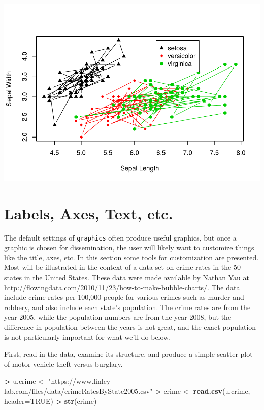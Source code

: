 \documentclass[
]{krantz}
\makeatletter
\newenvironment{Shaded}{\begin{snugshade}}{\end{snugshade}}
\newcommand{\DataTypeTok}[1]{\textcolor[rgb]{0.27,0.27,0.27}{#1}}
\newcommand{\KeywordTok}[1]{\textcolor[rgb]{0.27,0.27,0.27}{\textbf{#1}}}
\newcommand{\NormalTok}[1]{#1}
\newcommand{\OperatorTok}[1]{\textcolor[rgb]{0.43,0.43,0.43}{\textbf{#1}}}
\newcommand{\OtherTok}[1]{\textcolor[rgb]{0.37,0.37,0.37}{#1}}
\newcommand{\StringTok}[1]{\textcolor[rgb]{0.5,0.5,0.5}{#1}}
\newenvironment{kframe}{%
\medskip{}
\setlength{\fboxsep}{.8em}
 \def\at@end@of@kframe{}%
 \ifinner\ifhmode%
  \def\at@end@of@kframe{\end{minipage}}%
  \begin{minipage}{\columnwidth}%
 \fi\fi%
 \def\FrameCommand##1{\hskip\@totalleftmargin \hskip-\fboxsep
 \colorbox{shadecolor}{##1}\hskip-\fboxsep
     \hskip-\linewidth \hskip-\@totalleftmargin \hskip\columnwidth}%
 \MakeFramed {\advance\hsize-\width
   \@totalleftmargin\z@ \linewidth\hsize
   \@setminipage}}%
 {\par\unskip\endMakeFramed%
 \at@end@of@kframe}
\renewenvironment{Shaded}{\begin{kframe}}{\end{kframe}}
\makeatother
\begin{document}
\includegraphics{bookdown_files/figure-latex/unnamed-chunk-342-1.pdf}

\hypertarget{labels-axes-text-etc.-1}{%
\section{Labels, Axes, Text, etc.}\label{labels-axes-text-etc.-1}}

The default settings of \texttt{graphics} often produce useful graphics, but once a graphic is chosen for dissemination, the user will likely want to customize things like the title, axes, etc. In this section some tools for customization are presented. Most will be illustrated in the context of a data set on crime rates in the 50 states in the United States. These data were made available by Nathan Yau at \url{http://flowingdata.com/2010/11/23/how-to-make-bubble-charts/}. The data include crime rates per 100,000 people for various crimes such as murder and robbery, and also include each state's population. The crime rates are from the year 2005, while the population numbers are from the year 2008, but the difference in population between the years is not great, and the exact population is not particularly important for what we'll do below.

First, read in the data, examine its structure, and produce a simple scatter plot of motor vehicle theft versus burglary.

\begin{Shaded}
\begin{Highlighting}[]
\OperatorTok{\textgreater{}}\StringTok{ }\NormalTok{u.crime \textless{}{-}}\StringTok{ "https://www.finley{-}lab.com/files/data/crimeRatesByState2005.csv"}
\OperatorTok{\textgreater{}}\StringTok{ }\NormalTok{crime \textless{}{-}}\StringTok{ }\KeywordTok{read.csv}\NormalTok{(u.crime, }\DataTypeTok{header=}\OtherTok{TRUE}\NormalTok{)}
\OperatorTok{\textgreater{}}\StringTok{ }\KeywordTok{str}\NormalTok{(crime)}
\end{Highlighting}
\end{Shaded}
\end{document}
